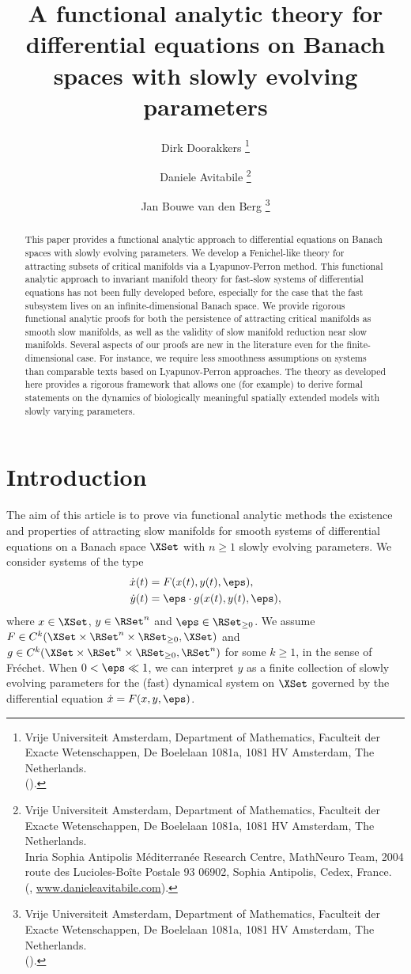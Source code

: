 \documentclass[a4paper]{siamart190516}
\title{A functional analytic theory for differential equations on Banach spaces with slowly evolving parameters}
\author{%
  Dirk Doorakkers%
  \thanks{%
    Vrije Universiteit Amsterdam,
    Department of Mathematics,
    Faculteit der Exacte Wetenschappen,
    De Boelelaan 1081a,
    1081 HV Amsterdam, The Netherlands.
  \protect\\
  (\email{h.a.doorakkers@vu.nl}).
  }
  \and
  Daniele Avitabile%
  \thanks{%
    Vrije Universiteit Amsterdam,
    Department of Mathematics,
    Faculteit der Exacte Wetenschappen,
    De Boelelaan 1081a,
    1081 HV Amsterdam, The Netherlands.
  \protect\\
    Inria Sophia Antipolis M\'editerran\'ee Research Centre,
    MathNeuro Team,
    2004 route des Lucioles-Boîte Postale 93 06902,
    Sophia Antipolis, Cedex, France.
  \protect\\
    (\email{d.avitabile@vu.nl}, \url{www.danieleavitabile.com}).
  }
  \and
  Jan Bouwe van den Berg%
  \thanks{%
    Vrije Universiteit Amsterdam,
    Department of Mathematics,
    Faculteit der Exacte Wetenschappen,
    De Boelelaan 1081a,
    1081 HV Amsterdam, The Netherlands.
  \protect\\
  (\email{janbouwe.vanden.berg@vu.nl}).
  }}
\begin{document}
\maketitle
\begin{abstract}
This paper provides a functional analytic approach to differential equations on Banach spaces with slowly evolving parameters. We develop a Fenichel-like 
theory for attracting subsets of critical manifolds via a Lyapunov-Perron method. This functional analytic approach to invariant manifold theory for fast-slow systems 
of differential equations has not been fully developed before, especially for the case that the fast subsystem lives on an infinite-dimensional Banach space. 
We provide rigorous functional analytic proofs for both the persistence of attracting critical manifolds as smooth slow manifolds, as well as the validity of slow manifold 
reduction near slow manifolds. Several aspects of our proofs are new in the literature even for the finite-dimensional case. For instance, we require less smoothness
assumptions on systems than comparable texts based on Lyapunov-Perron approaches. The theory as developed here provides 
a rigorous framework that allows one (for example) to derive formal statements on the dynamics of biologically meaningful spatially extended models with slowly varying parameters.
\end{abstract}



 \section{Introduction}

The aim of this article is to prove via functional analytic methods the existence and
properties of attracting slow manifolds for smooth systems of differential equations
on a Banach space $\XSet$ with $n \geq 1$ slowly evolving parameters. We consider
systems of the type
 \begin{align}
 \begin{split} \label{eq:fs-system}
 \dot{x}(t) &= F(x(t),y(t),\eps), \\
 \dot{y}(t) &= \eps \cdot g(x(t),y(t), \eps),
 \end{split}
 \end{align}
 where $x\in \XSet$, $y \in \RSet^n$ and $\eps\in \RSet_{\geq 0}$. We assume $F \in
 C^{k}(\XSet \times \RSet^n \times \RSet_{\geq 0},\XSet)$ and $g \in C^k(\XSet \times
 \RSet^n \times \RSet_{\geq 0},\RSet^n)$ for some $k \geq 1$, in the sense of
 Fr\'echet.  When $0 < \eps\ll 1$, we can interpret $y$ as a finite collection of
 slowly evolving parameters for the (fast) dynamical system on $\XSet$ governed by
 the differential equation $\dot{x} = F(x,y, \eps)$.
 
\end{document}

